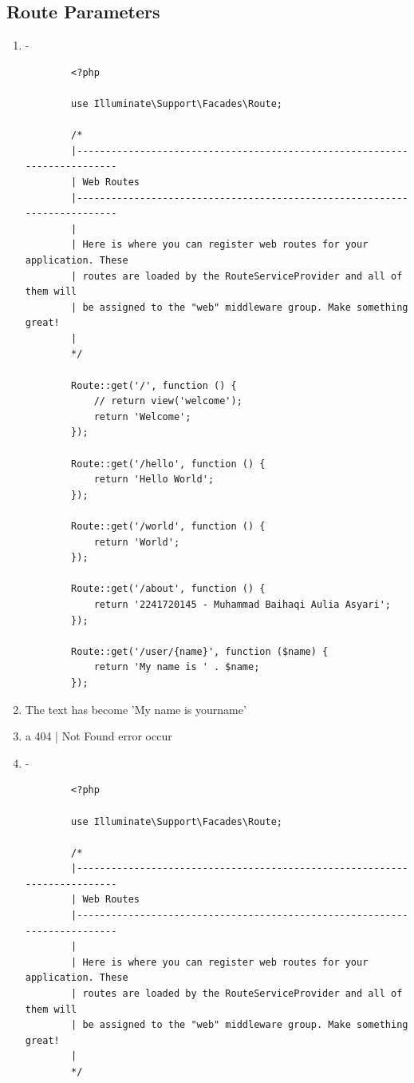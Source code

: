 \documentclass[12pt,titlepage]{article}
\begin{document}
\subsection{Route Parameters}
\begin{enumerate}[label=\alph*.]
    \item -
    \begin{verbatim}
        <?php

        use Illuminate\Support\Facades\Route;
        
        /*
        |--------------------------------------------------------------------------
        | Web Routes
        |--------------------------------------------------------------------------
        |
        | Here is where you can register web routes for your application. These
        | routes are loaded by the RouteServiceProvider and all of them will
        | be assigned to the "web" middleware group. Make something great!
        |
        */
        
        Route::get('/', function () {
            // return view('welcome');
            return 'Welcome';
        });
        
        Route::get('/hello', function () {
            return 'Hello World';
        });
        
        Route::get('/world', function () {
            return 'World';
        }); 
        
        Route::get('/about', function () {
            return '2241720145 - Muhammad Baihaqi Aulia Asyari';
        }); 
        
        Route::get('/user/{name}', function ($name) {
            return 'My name is ' . $name;
        }); 
    \end{verbatim}
    \item The text has become 'My name is yourname'
    \item a 404 | Not Found error occur
    \item -
    \begin{verbatim}
        <?php

        use Illuminate\Support\Facades\Route;
        
        /*
        |--------------------------------------------------------------------------
        | Web Routes
        |--------------------------------------------------------------------------
        |
        | Here is where you can register web routes for your application. These
        | routes are loaded by the RouteServiceProvider and all of them will
        | be assigned to the "web" middleware group. Make something great!
        |
        */
        

\end{verbatim}
\end{enumerate}
\end{document}
